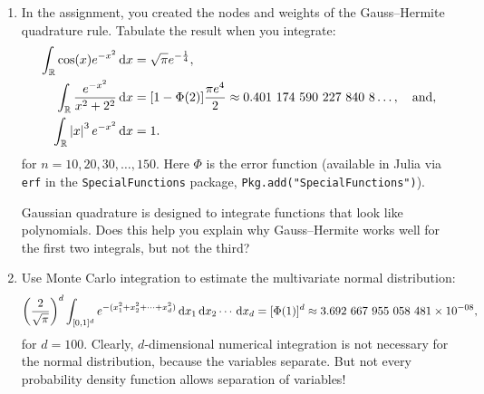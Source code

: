 \documentclass[11pt,letterpaper]{article}
\begin{document}
\begin{enumerate}
\item In the assignment, you created the nodes and weights of the Gauss--Hermite quadrature rule. Tabulate the result when you integrate:
\begin{align*}
\int_{\mathbb{R}} \cos(x) e^{-x^2}{\rm\,d} x & = \sqrt{\pi}e^{-\frac{1}{4}},\\
\int_{\mathbb{R}} \dfrac{e^{-x^2}}{x^2+2^2}{\rm\,d} x & = [1-\Phi(2)]\dfrac{\pi e^4}{2} \approx 0.401~174~590~227~840~8\ldots,\quad{\rm and},\\
\int_{\mathbb{R}} \left|{x}\right|^3e^{-x^2}{\rm\,d} x & = 1.
\end{align*}
for $n=10,20,30,\ldots,150$. Here $\Phi$ is the error function (available in {\sc Julia} via \verb+erf+ in the \verb+SpecialFunctions+ package, \verb+Pkg.add("SpecialFunctions")+).

Gaussian quadrature is designed to integrate functions that look like polynomials. Does this help you explain why Gauss--Hermite works well for the first two integrals, but not the third?

\item Use Monte Carlo integration to estimate the multivariate normal distribution:
\[
\left(\dfrac{2}{\sqrt{\pi}}\right)^d\int_{[0,1]^{d}} e^{-(x_1^2+x_2^2+\cdots+x_d^2)}{\rm\,d} x_1{\rm\,d} x_2\cdots{\rm\,d} x_d = [\Phi(1)]^d \approx 3.692~667~955~058~481\times10^{-08},
\]
for $d=100$. Clearly, $d$-dimensional numerical integration is not necessary for the normal distribution, because the variables separate. But not every probability density function allows separation of variables!

\end{enumerate}
\end{document}
